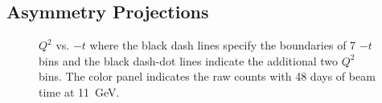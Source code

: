 \subsection{Asymmetry Projections}

\begin{figure}[!ht]
 \begin{center}
   \caption[$Q^{2}$ vs. $-t$]{\footnotesize{$Q^{2}$ vs. $-t$ where the black
dash lines specify the boundaries of 7 $-t$ bins and the black dash-dot lines
indicate the additional two $Q^{2}$ bins.  The color panel indicates the raw
counts with 48 days of beam time at 11~GeV.}}
  \label{Q2_t_bin}
  \end{center}
\end{figure}

